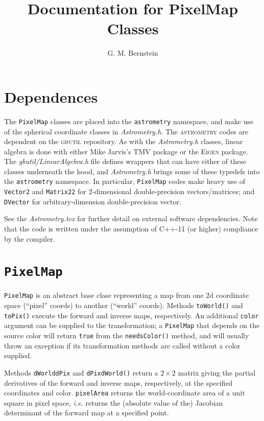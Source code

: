 \documentclass[11pt,preprint,flushrt]{aastex}
\begin{document}

\title{Documentation for PixelMap Classes}

\author{G. M. Bernstein}

\section{Dependences}
The {\tt PixelMap} classes are placed into the {\tt astrometry} namespace, and make use of the spherical coordinate classes in {\it Astrometry.h}.
 The \textsc{astrometry} codes are dependent on the \textsc{gbutil} repository.
 As with the {\it Astrometry.h} classes, linear algebra is done with either Mike Jarvis's {\sc TMV} package or the \textsc{Eigen} package.  The \textit{gbutil/LinearAlgebra.h} file defines wrappers that can have either of these classes underneath the hood, and {\it Astrometry.h} brings some of these typedefs into the \texttt{astrometry} namespace.  In particular, \texttt{PixelMap} codes make heavy use of  {\tt Vector2} and {\tt Matrix22} for 2-dimensional double-precision vectors/matrices; and {\tt DVector} for arbitrary-dimension double-precision vector. 

See the \textit{Astrometry.tex} for further detail on external software dependencies.  Note that the code is written under the assumption of C++-11 (or higher) compliance by the compiler.

\section{{\tt PixelMap}}
{\tt PixelMap} is an abstract base clase representing a map from one
2d coordinate space (``pixel'' coords) to another (``world'' coords).
Methods {\tt toWorld()} and {\tt toPix()} execute the forward and inverse maps, respectively.  
An additional \texttt{color} argument can be supplied to the transformation; a \texttt{PixelMap} that depends on the source color will return \texttt{true} from the \texttt{needsColor()} method, and will usually throw
an exception if its transformation methods are called without a color supplied.

Methods {\tt  dWorlddPix}  and {\tt dPixdWorld()} return a $2\times2$ matrix giving the partial derivatives of the forward and inverse maps, respectively, at the specified coordinates and color.
{\tt pixelArea} returns the world-coordinate area of a unit square in pixel space, {\it i.e.} returns the (absolute value of the) Jacobian determinant of the forward map at a specified point.
\end{document}
